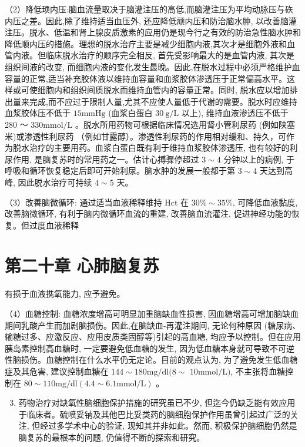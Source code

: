 \documentclass[10pt]{article}
\begin{document}
（2）降低顼内压:脑血流量取决于脑灌注压的高低,而脑灌注压为平均动脉压与䂠内压之差。因此,除了维持适当血压外, 还应降低顽内压和防治脑水肿, 以改善脑灌注压。脱水、低温和肾上腺皮质激素的应用仍是现今行之有效的防治急性脑水肿和降低顺内压的措施。理想的脱水治疗主要是减少细胞内液,其次才是细胞外液和血管内液。但临床脱水治疗的顺序完全相反, 首先受影响最大的是血管内液, 其次是组织间液的改变, 而细胞内液的变化发生最晚。因此,在脱水过程中必须严格维护血容量的正常,适当补充胶体液以维持血容量和血浆胶体渗透压于正常偏高水平。这样或可使细胞内和组织间质脱水而维持血管内的容量正常。同时, 脱水应以增加排出量来完成,而不应过于限制人量,尤其不应使人量低于代谢的需要。脱水时应维持血浆胶体压不低于 $15 \mathrm{mmHg}$ (血浆白蛋白 $30 \mathrm{~g} / \mathrm{L}$ 以上), 维持血液渗透压不低于 280 ～ $330 \mathrm{mmol} / \mathrm{L}$ 。脱水所用药物可根据临床情况选用肾小管利尿药 (例如陕塞米)或渗透性利尿药 （例如甘露醇）。渗透性利尿药的作用相对缓和、持久，可作为脱水治疗的主要用药。血浆白蛋白既有利于维持血浆胶体渗透压, 也有较好的利尿作用, 是脑复苏时的常用药之一。估计心搏骤停超过 $3 \sim 4$ 分钟以上的病例, 于呼吸和循环恢复稳定后即可开始利尿。脑水肿的发展一般都于第 $3 \sim 4$ 天达到高峰, 因此脱水治疗可持续 $4 \sim 5$ 天。

（3）改善脑微循环: 通过适当血液稀释维持 Hct 在 $30 \% \sim 35 \%$, 可降低血液黏度, 改善脑微循环, 有利于脑内微循环血流的重建, 改善脑血流灌注, 促进神经功能的恢复。但过度血液稀释

\section*{第二十章 心肺脑复苏}
有损于血液携氧能力, 应予避免。

（4）血糖控制: 血糖浓度增高可明显加重脑缺血性损害, 因血糖增高可增加脑缺血期间乳酸产生而加剧脑损伤。因此,在脑缺血-再灌注期间, 无论何种原因 (糖尿病、输糖过多、应激反应、应用皮质类固醇等)引起的高血糖, 均应予以控制。但在应用胰岛素控制高血糖时, 一定要避免低血糖的发生, 因为低血糖本身就可导致不可逆性脑损伤。血糖控制在什么水平仍无定论。目前的观点认为, 为了避免发生低血糖症及其危害, 建议控制血糖在 $144 \sim 180 \mathrm{mg} / \mathrm{dl}(8 \sim$ $10 \mathrm{mmol} / \mathrm{L})$, 不主张将血糖控制在 $80 \sim 110 \mathrm{mg} / \mathrm{dl}(4.4 \sim 6.1 \mathrm{mmol} / \mathrm{L})$ 。

\begin{enumerate}
  \setcounter{enumi}{2}
  \item 药物治疗对缺氧性脑细胞保护措施的研究虽已不少, 但迄今仍缺乏能有效应用于临床者。硫喷妥钠及其他巴比妥类药的脑细胞保护作用虽曾引起过广泛的关注, 但经过多学术中心的验证, 现知其并非如此。然而, 积极保护脑细胞仍然是脑复苏的最根本的问题, 仍值得不断的探索和研究。
\end{enumerate}
\end{document}
